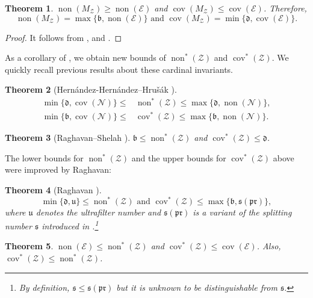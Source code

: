 \documentclass[a4paper,12pt]{amsart}
\newtheorem{thm}{Theorem}
\theoremstyle{definition}
\numberwithin{thm}{section}
\numberwithin{equation}{section}
\newcommand{\bb}{\mathfrak{b}}
\newcommand{\dd}{\mathfrak{d}}
\newcommand{\uu}{\mathfrak{u}}
\newcommand{\n}{\mathcal{N}}
\DeclareMathOperator{\non}{non}
\DeclareMathOperator{\cov}{cov}
\newcommand{\none}{\non(\mathcal{E})}
\newcommand{\cove}{\cov(\mathcal{E})}
\newcommand{\Z}{\mathcal{Z}}
\begin{document}
    \begin{thm} \label{thm:nonMZ_exact_value}
        $\non(M_{\Z})\geq\none$ and $\cov(M_{\Z})\leq\cove$. Therefore,
        \[
        \non(M_\Z)=\max\{\bb,\none\}\text{ and }\cov(M_\Z)=\min\{\dd,\cove\}.
        \]
    \end{thm}
    \begin{proof}
        It follows from ,  and .
    \end{proof}
    
    As a corollary of , we obtain new bounds of $\non^*(\Z)$ and $\cov^*(\Z)$. We quickly recall previous results about these cardinal invariants.
    
    \begin{thm}[Hern\'andez-Hern\'andez--Hru\v s\'ak \cite{HH07}]\leavevmode
        \begin{align*}
            \min\{\dd, \cov(\n)\}\leq & \non^*(\Z)\leq\max\{\dd, \non(\n)\},\\
            \min\{\bb, \cov(\n)\}\leq & \cov^*(\Z)\leq\max\{\bb, \non(\n)\}.
        \end{align*}
    \end{thm}
    
    \begin{thm}[Raghavan--Shelah \cite{RS17}]
        \label{fac:nonZ_covZ_bounds}
        $\bb\leq\non^*(\Z)$ and $\cov^*(\Z)\leq\dd$.
    \end{thm}
    
    The lower bounds for $\non^*(\Z)$ and the upper bounds for $\cov^*(\Z)$ above were improved by Raghavan:
    
    \begin{thm}[Raghavan \cite{Rag20}]\label{fac:nonZ_covZ_bounds_2}
        \[
        \min\{\dd,\uu\}\leq\non^*(\Z)\text{ and }\cov^*(\Z)\leq\max\{\bb,\mathfrak{s}(\mathfrak{pr})\},
        \]
        where $\uu$ denotes the ultrafilter number and $\mathfrak{s}(\mathfrak{pr})$ is a variant of the splitting number $\mathfrak{s}$ introduced in \cite{Rag20}.\footnote{By definition, $\mathfrak{s}\leq\mathfrak{s}(\mathfrak{pr})$ but it is unknown to be distinguishable from $\mathfrak{s}$.}
    \end{thm}
    
    \begin{thm}\label{thm:new_bounds}
        $\none\leq\non^*(\Z)$ and $\cov^*(\Z)\leq\cove$. Also, $\cov^*(\Z)\leq\non^*(\Z)$.
    \end{thm}
    
\end{document}
